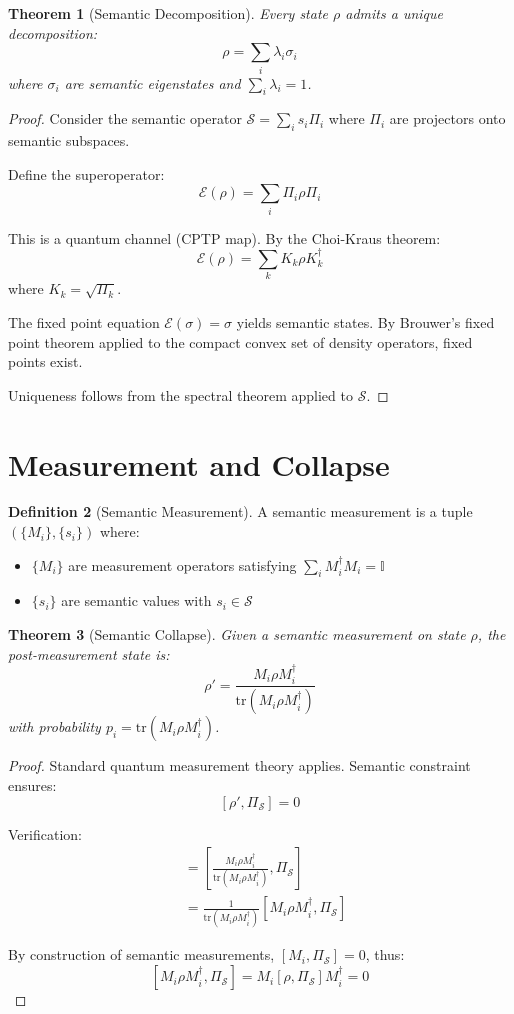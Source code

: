 \documentclass[12pt,a4paper]{article}
\theoremstyle{plain}
\newtheorem{theorem}{Theorem}[section]
\theoremstyle{definition}
\newtheorem{definition}[theorem]{Definition}
\newcommand{\Sem}{\mathcal{S}}
\newcommand{\tr}{\mathrm{tr}}
\begin{document}
\begin{theorem}[Semantic Decomposition]
Every state $\rho$ admits a unique decomposition:
\[
\rho = \sum_{i} \lambda_i \sigma_i
\]
where $\sigma_i$ are semantic eigenstates and $\sum_i \lambda_i = 1$.
\end{theorem}

\begin{proof}
Consider the semantic operator $\Sem = \sum_i s_i \Pi_i$ where $\Pi_i$ are projectors onto semantic subspaces. 

Define the superoperator:
\[
\mathcal{E}(\rho) = \sum_i \Pi_i \rho \Pi_i
\]

This is a quantum channel (CPTP map). By the Choi-Kraus theorem:
\[
\mathcal{E}(\rho) = \sum_k K_k \rho K_k^\dagger
\]
where $K_k = \sqrt{\Pi_k}$.

The fixed point equation $\mathcal{E}(\sigma) = \sigma$ yields semantic states. By Brouwer's fixed point theorem applied to the compact convex set of density operators, fixed points exist.

Uniqueness follows from the spectral theorem applied to $\Sem$.
\end{proof}

\section{Measurement and Collapse}

\begin{definition}[Semantic Measurement]
A semantic measurement is a tuple $(\{M_i\}, \{s_i\})$ where:
\begin{itemize}
\item $\{M_i\}$ are measurement operators satisfying $\sum_i M_i^\dagger M_i = \mathbb{I}$
\item $\{s_i\}$ are semantic values with $s_i \in \Sem$
\end{itemize}
\end{definition}

\begin{theorem}[Semantic Collapse]
Given a semantic measurement on state $\rho$, the post-measurement state is:
\[
\rho' = \frac{M_i \rho M_i^\dagger}{\tr(M_i \rho M_i^\dagger)}
\]
with probability $p_i = \tr(M_i \rho M_i^\dagger)$.
\end{theorem}

\begin{proof}
Standard quantum measurement theory applies. Semantic constraint ensures:
\[
[\rho', \Pi_{\Sem}] = 0
\]

Verification:
\begin{align}
[\rho', \Pi_{\Sem}] &= \left[\frac{M_i \rho M_i^\dagger}{\tr(M_i \rho M_i^\dagger)}, \Pi_{\Sem}\right] \\
&= \frac{1}{\tr(M_i \rho M_i^\dagger)} [M_i \rho M_i^\dagger, \Pi_{\Sem}]
\end{align}

By construction of semantic measurements, $[M_i, \Pi_{\Sem}] = 0$, thus:
\[
[M_i \rho M_i^\dagger, \Pi_{\Sem}] = M_i [\rho, \Pi_{\Sem}] M_i^\dagger = 0
\]
\end{proof}
\end{document}
